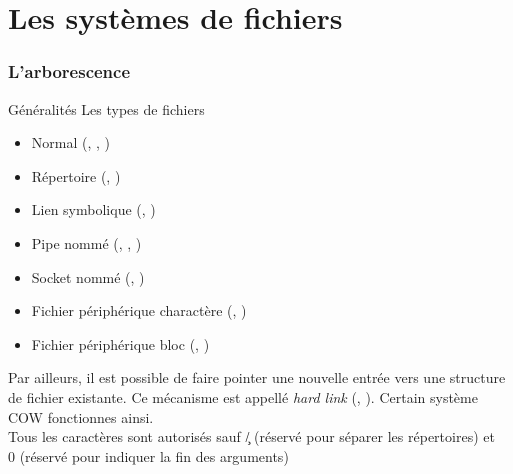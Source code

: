 %
%
%

\part{Les systèmes de fichiers}

\begin{frame}
  \partpage
\end{frame}

\begin{frame}
  \tableofcontents
\end{frame}

\section{L'arborescence}

\begin{frame}[fragile=singleslide]{Généralités}
  Les types de fichiers
  \begin{itemize}
  \item Normal (, , )
  \item Répertoire (, )
  \item Lien symbolique (, )
  \item Pipe nommé (, , )
  \item Socket nommé (, )
  \item     Fichier    périphérique     charactère    (,
    )
  \item Fichier périphérique bloc (, )
  \end{itemize}

  Par ailleurs, il  est possible de faire pointer  une nouvelle entrée
  vers une  structure de fichier existante.  Ce  mécanisme est appellé
  \emph{hard link}  (, ). Certain  système COW
  fonctionnes ainsi.
  \\
  Tous les caractères sont  autorisés sauf \c{/} (réservé pour séparer
  les  répertoires)  et \c{\\0}  (réservé  pour  indiquer  la fin  des
  arguments)
\end{frame}

